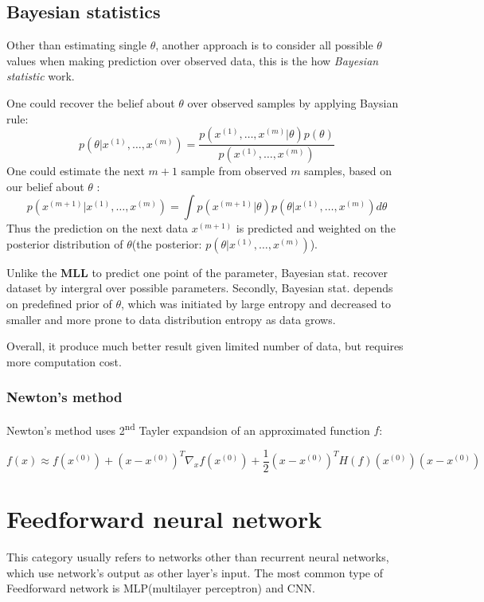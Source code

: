 \documentclass{article}
\begin{document}
{\subsection*{Bayesian statistics}
Other than estimating single $\theta$, another approach is to consider all possible $\theta$ values when making prediction over observed data, this is the how \textit{Bayesian statistic} work. \par
One could recover the belief about $\theta$ over observed samples by applying Baysian rule:
\begin{equation}
    p(\theta|x^{(1)},\dots,x^{(m)}) = \frac{p(x^{(1)},\dots,x^{(m)}|\theta)p(\theta)}{p(x^{(1)},\dots,x^{(m)})}
\end{equation}
One could estimate the next $m+1$ sample from observed $m$ samples, based on our belief about $\theta$ :
\begin{equation}
    p(x^{(m+1)}|x^{(1)},\dots,x^{(m)}) = \int p(x^{(m+1)}|\theta)p(\theta|x^{(1)},\dots,x^{(m)})d\theta
\end{equation}
Thus the prediction on the next data $x^{(m+1)}$ is predicted and weighted on the posterior distribution of $\theta$(the posterior: $p(\theta|x^{(1)},\dots,x^{(m)})$).\par
Unlike the \textbf{MLL} to predict one point of the parameter, Bayesian stat. recover dataset by intergral over possible parameters. Secondly, Bayesian stat. depends on predefined prior of $\theta$, which was initiated by large entropy and decreased to smaller and more prone to data distribution entropy as data grows.\par
Overall, it produce much better result given limited number of data, but requires more computation cost.

\subsubsection*{Newton's method}
Newton's method uses 2\textsuperscript{nd} Tayler expandsion of an approximated function $f$:

$$f(x) \approx f(x^{(0)}) + (x-x^{(0)})^{T}\nabla_{x}f(x^{(0)}) + \frac{1}{2}(x-x^{(0)})^{T}H(f)(x^{(0)})(x-x^{(0)})$$

\section{Feedforward neural network}
This category usually refers to networks other than recurrent neural networks, which use network's output as other layer's input. The most common type of Feedforward network is MLP(multilayer perceptron) and CNN.

}
\end{document}
